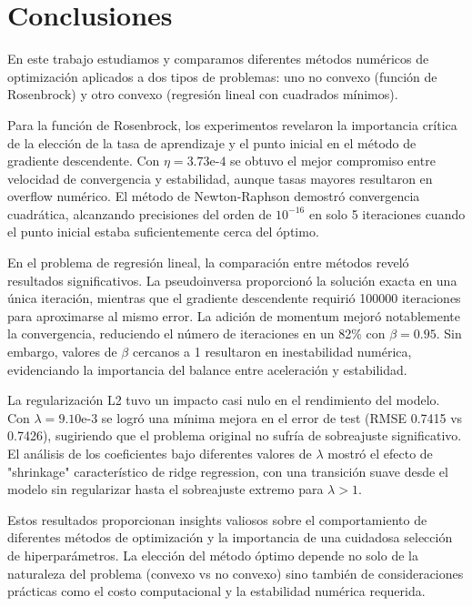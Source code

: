 \documentclass{tp02}
\begin{document}
\section{Conclusiones}

En este trabajo estudiamos y comparamos diferentes métodos 
numéricos de optimización aplicados a dos tipos de problemas: uno no 
convexo (función de Rosenbrock) y otro convexo (regresión lineal con 
cuadrados mínimos).

Para la función de Rosenbrock, los experimentos revelaron la 
importancia crítica de la elección de la tasa de aprendizaje y el 
punto inicial en el método de gradiente descendente. Con 
$\eta = 3.73\text{e-}4$ se obtuvo el mejor compromiso entre velocidad 
de convergencia y estabilidad, aunque tasas mayores resultaron en 
overflow numérico. El método de Newton-Raphson demostró convergencia 
cuadrática, alcanzando precisiones del orden de $10^{-16}$ en solo 5 
iteraciones cuando el punto inicial estaba suficientemente cerca del 
óptimo.

En el problema de regresión lineal, la comparación entre métodos 
reveló resultados significativos. La pseudoinversa proporcionó la 
solución exacta en una única iteración, mientras que el gradiente 
descendente requirió 100000 iteraciones para aproximarse al mismo 
error. La adición de momentum mejoró notablemente la convergencia, 
reduciendo el número de iteraciones en un 82\% con $\beta = 0.95$. Sin 
embargo, valores de $\beta$ cercanos a 1 resultaron en inestabilidad 
numérica, evidenciando la importancia del balance entre aceleración y 
estabilidad.

La regularización L2 tuvo un impacto casi nulo en el rendimiento del 
modelo. Con $\lambda = 9.10\text{e-}3$ se logró una mínima mejora en 
el error de test (RMSE 0.7415 vs 0.7426), sugiriendo que el problema 
original no sufría de sobreajuste significativo. El análisis de los 
coeficientes bajo diferentes valores de $\lambda$ mostró el efecto de 
"shrinkage" característico de ridge regression, con una transición 
suave desde el modelo sin regularizar hasta el sobreajuste extremo 
para $\lambda > 1$.

Estos resultados proporcionan insights valiosos sobre el 
comportamiento de diferentes métodos de optimización y la importancia 
de una cuidadosa selección de hiperparámetros. La elección del 
método óptimo depende no solo de la naturaleza del problema 
(convexo vs no convexo) sino también de consideraciones prácticas 
como el costo computacional y la estabilidad numérica requerida.
\end{document}
